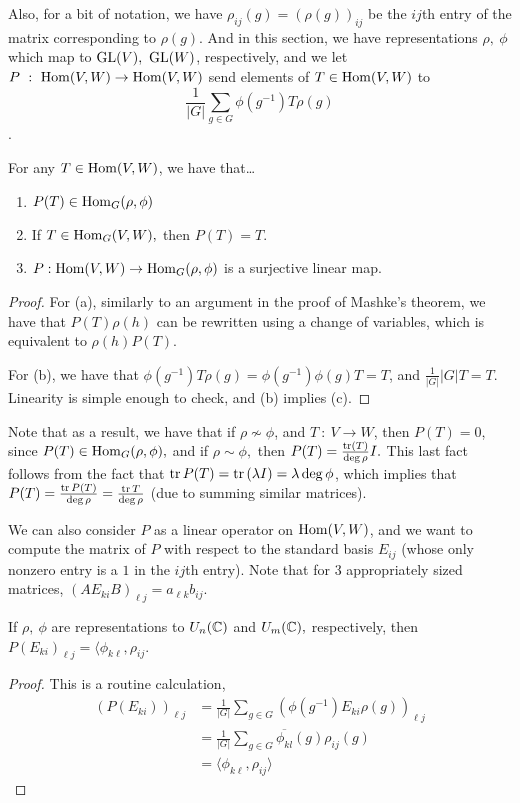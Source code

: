 \documentclass{article}
\begin{document}
Also, for a bit of notation, we have $\rho_{ij}(g) = (\rho(g))_{ij}$ be the $ij$th entry of the matrix corresponding to $\rho(g)$. And in this section, we have representations $\rho, \ \phi$ which map to $\operatorname{GL}(V), \ \operatorname{GL}(W)$, respectively, and we let $P \ : \ \operatorname{Hom}(V,W) \to \operatorname{Hom}(V,W)$ send elements of $T \in \operatorname{Hom}(V,W)$ to $$\frac{1}{|G|} \sum_{g \in G} \phi(g^{-1})T\rho(g)$$.

\begin{lemma}
For any $T \in \operatorname{Hom}(V,W)$, we have that\ldots
\begin{enumerate}[label=(\alph*)]
    \item $P(T) \in \operatorname{Hom}_G(\rho,\phi)$
    \item If $T \in \operatorname{Hom}_G(V,W),$ then $P(T)=T$.
    \item $P : \operatorname{Hom}(V,W) \to \operatorname{Hom}_G(\rho,\phi)$ is a surjective linear map.
\end{enumerate}
\end{lemma}

\begin{proof}

For (a), similarly to an argument in the proof of Mashke's theorem, we have that $P(T)\rho(h)$ can be rewritten using a change of variables, which is equivalent to $\rho(h)P(T).$

For (b), we have that $\phi(g^{-1})T\rho(g)=\phi(g^{-1})\phi(g)T=T$, and $\frac{1}{|G|} |G|T = T$. Linearity is simple enough to check, and (b) implies (c).

\end{proof}

Note that as a result, we have that if $\rho \not\sim \phi$, and $T \ : \ V \to W$, then $P(T) = 0$, since $P(T) \in \operatorname{Hom}_G(\rho,\phi),$ and if $\rho \sim \phi,$ then $P(T) = \frac{\operatorname{tr} (T)}{\deg \rho} I.$ This last fact follows from the fact that $\operatorname{tr} P(T)= \operatorname{tr} \left( \lambda I \right) = \lambda \deg \phi$, which implies that $P(T) = \frac{\operatorname{tr} P(T)}{\deg \rho} = \frac{\operatorname{tr} T}{\deg \rho}$ (due to summing similar matrices). 

We can also consider $P$ as a linear operator on $\operatorname{Hom}(V,W)$, and we want to compute the matrix of $P$ with respect to the standard basis $E_{ij}$ (whose only nonzero entry is a $1$ in the $ij$th entry). Note that for 3 appropriately sized matrices, $(AE_{ki}B)_{\ell j} = a_{\ell k}b_{ij}$.

\begin{lemma}

If $\rho, \ \phi$ are representations to $U_n(\mathbb C)$ and $U_m(\mathbb C),$ respectively, then $P(E_{ki})_{\ell j} = \langle \phi_{k\ell}, \rho_{ij}$.

\end{lemma}
\begin{proof}
This is a routine calculation,
\begin{align*}
    (P(E_{ki}))_{\ell j} &= \frac{1}{|G|} \sum_{g \in G} (\phi(g^{-1})E_{ki}\rho(g))_{\ell j} \\
    &= \frac{1}{|G|} \sum_{g \in G} \overline{\phi_{kl}}(g)\rho_{ij}(g) \\
    &= \langle \phi_{k\ell}, \rho_{ij}\rangle
\end{align*}
\end{proof}
\end{document}
